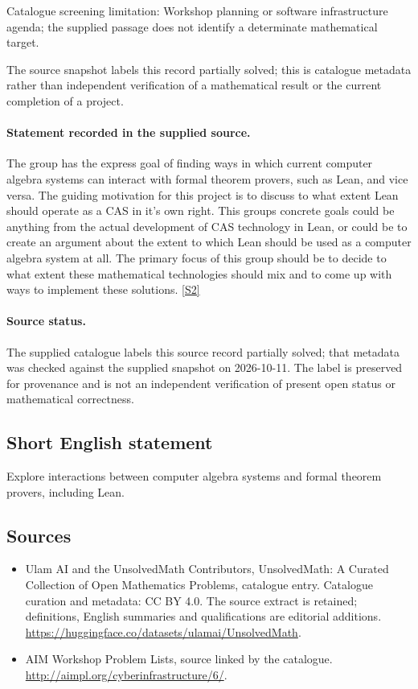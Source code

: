 \documentclass[11pt]{article}
\begin{document}
Catalogue screening limitation: Workshop planning or software infrastructure agenda; the supplied passage does not identify a determinate mathematical target.

The source snapshot labels this record partially solved; this is catalogue metadata rather than independent verification of a mathematical result or the current completion of a project.
\paragraph{Statement recorded in the supplied source.}
The group has the express goal of finding ways in which current computer algebra systems can interact with formal theorem provers, such as Lean, and vice versa. The guiding motivation for this project is to discuss to what extent Lean should operate as a CAS in it's own right. This groups concrete goals could be anything from the actual development of CAS technology in Lean, or could be to create an argument about the extent to which Lean should be used as a computer algebra system at all.
The primary focus of this group should be to decide to what extent these mathematical technologies should mix and to come up with ways to implement these solutions. \href{http://aimpl.org/cyberinfrastructure/6/}{[S2]}
\paragraph{Source status.}
The supplied catalogue labels this source record partially solved; that metadata was checked against the supplied snapshot on 2026-10-11. The label is preserved for provenance and is not an independent verification of present open status or mathematical correctness.
\subsection{Short English statement}
Explore interactions between computer algebra systems and formal theorem provers, including Lean.
\subsection{Sources}
\begin{itemize}
\item[S1] Ulam AI and the UnsolvedMath Contributors, UnsolvedMath: A Curated Collection of Open Mathematics Problems, catalogue entry. Catalogue curation and metadata: CC BY 4.0. The source extract is retained; definitions, English summaries and qualifications are editorial additions.
\url{https://huggingface.co/datasets/ulamai/UnsolvedMath}.
\item[S2] AIM Workshop Problem Lists, source linked by the catalogue.
\url{http://aimpl.org/cyberinfrastructure/6/}.
\end{itemize}
\end{document}
